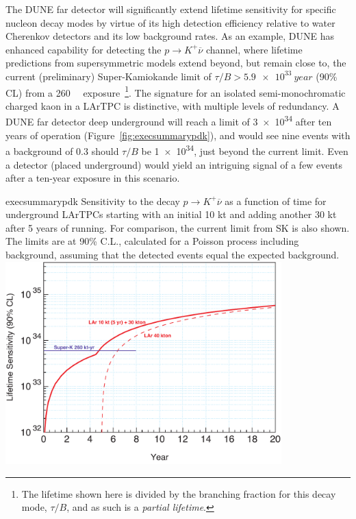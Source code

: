 The DUNE far detector will significantly extend lifetime sensitivity for specific nucleon decay
modes by virtue of its high detection efficiency relative to water Cherenkov detectors and its 
low background rates.  As an example, DUNE has
enhanced capability for detecting the $p\to K^+\overline{\nu}$
channel, where lifetime predictions from supersymmetric models extend
beyond, but remain close to, the current (preliminary)
Super-Kamiokande limit of  $\tau/B > \SI{5.9e33}{year}$ (90\% CL)
from a \SI[number-unit-product = -, inter-unit-product=\ensuremath{{}\cdot{}}]{260}{\kt\year}
exposure~\cite{kearns_isoups}\footnote{The lifetime shown here is divided by the branching
fraction for this decay mode, $\tau/B$, and as such is a \emph{partial lifetime}.}.  
The signature for an
isolated semi-monochromatic charged kaon in a LArTPC is distinctive,
with multiple levels of redundancy.  A  DUNE far detector deep
underground will reach a limit of \SI{3e34}{\year} after ten years
of operation (Figure~\ref{fig:execsummarypdk}), and would see nine
events with a background of 0.3 should $\tau/B$ be \SI{1e34}{\year}, just beyond the
current limit.
Even a  detector 
(placed underground) 
would yield an intriguing signal of a few events after a ten-year exposure 
in this scenario.

\begin{cdrfigure}{execsummarypdk} {Sensitivity to the
    decay $p\to K^+ \overline{\nu}$ as a function of time for
    underground  LArTPCs starting with an initial 10 kt and adding another 30 kt
after 5 years of running.
  For comparison, the current limit from SK is also shown.
  The limits are at 90\% C.L., calculated for
  a Poisson process including background, assuming that the detected events
  equal the expected background.}
\includegraphics[width=0.8\textwidth]{volume-physics/figures/lar10-40.pdf}
\end{cdrfigure}

